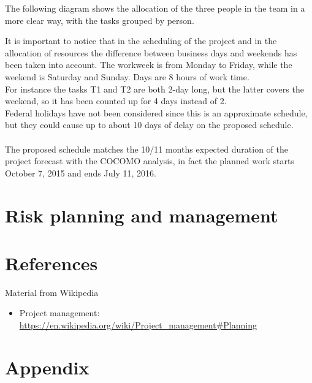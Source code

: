 \documentclass[a4paper,11pt]{report} %
\begin{document}
		The following diagram shows the allocation of the three people in the team in a more clear way, with the tasks grouped by person.\\
		\begin{minipage}{\linewidth}
		\end{minipage}
		It is important to notice that in the scheduling of the project and in the allocation of resources the difference between business days and weekends has been taken into account. The workweek is from Monday to Friday, while the weekend is Saturday and Sunday. Days are 8 hours of work time.\\
		For instance the tasks T1 and T2 are both 2-day long, but the latter covers the weekend, so it has been counted up for 4 days instead of 2.\bigskip\\
		Federal holidays have not been considered since this is an approximate schedule, but they could cause up to about 10 days of delay on the proposed schedule.\\
		\smallskip\\
		The proposed schedule matches the 10/11 months expected duration of the project forecast with the COCOMO analysis, in fact the planned work starts October 7, 2015 and ends July 11, 2016.
	
	\pagebreak
	\section{Risk planning and management}	

	\pagebreak
	\section{References}
		Material from Wikipedia
		\begin{itemize}
			\item Project management: \href{https://en.wikipedia.org/wiki/Project\_management\#Planning}{https://en.wikipedia.org/wiki/Project\_management\#Planning}
		\end{itemize}
	
	\section{Appendix}
\end{document}
